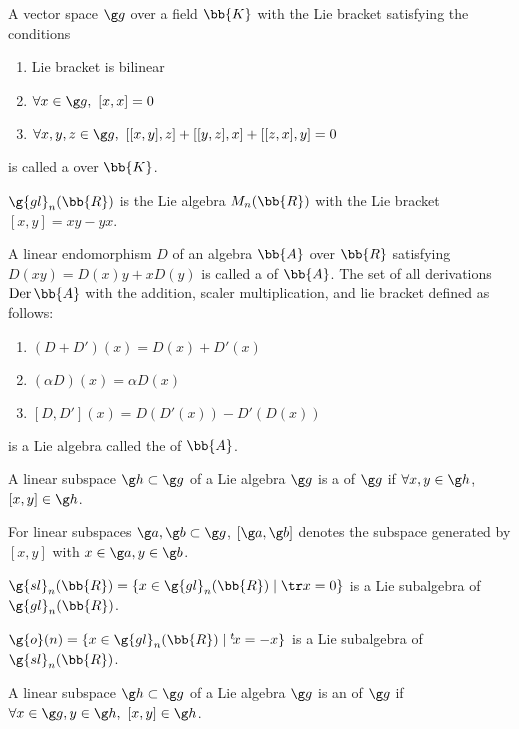 \newcommand{\gl}{\g{gl}}
\renewcommand{\sl}{\g{sl}}
\renewcommand{\o}{\g{o}}
\cite{samu}
A vector space $\g g$ over a field $\bb{K}$ with the Lie bracket satisfying the conditions
\begin{enumerate}
\item Lie bracket is bilinear
\item $\forall x \in \g g,\ [x,x] = 0$
\item $\forall x, y, z \in \g g,\ [[x,y],z]+[[y,z],x]+[[z,x],y] = 0$
\end{enumerate}
is called a  over $\bb{K}$.

$\g{gl}_n(\bb{R})$ is the Lie algebra $M_n(\bb{R})$ with the Lie bracket $[x,y] = xy - yx$.

A linear endomorphism $D$ of an algebra $\bb{A}$ over $\bb{R}$ satisfying $D(xy) = D(x)y + xD(y)$ is called a  of $\bb{A}$. The set of all derivations $\mathrm{Der}\, \bb{A}$ with the addition, scaler multiplication, and lie bracket defined as follows:
\begin{enumerate}
\item $(D+D')(x) = D(x)+D'(x)$
\item $(\alpha D)(x) = \alpha D(x)$
\item $[D,D'](x) = D(D'(x)) - D'(D(x))$
\end{enumerate}
is a Lie algebra called the  of $\bb{A}$.

A linear subspace $\g h \subset \g g$ of a Lie algebra $\g g$ is a  of $\g g$ if $\forall x, y \in \g h$, $[x,y] \in \g h$.

For linear subspaces $\g a, \g b \subset \g g$, $[\g a, \g b]$ denotes the subspace generated by $[x,y]$ with $x \in \g a, y \in \g b$.

$\sl_n(\bb{R}) = \{ x \in \gl_n(\bb{R}) \mid \tr x = 0 \} $ is a Lie subalgebra of $\gl_n(\bb{R})$.

$\o(n) = \{ x \in \gl_n(\bb{R}) \mid {}^t\!x = -x \}$ is a Lie subalgebra of $\sl_n(\bb{R})$.

A linear subspace $\g h \subset \g g$ of a Lie algebra $\g g$ is an  of $\g g$ if $\forall x \in \g g, y \in \g h,\ [x,y] \in \g h$.

